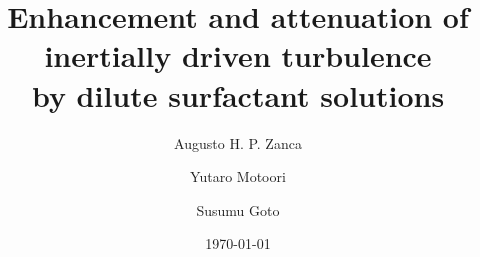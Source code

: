 \documentclass[aps,prfluids,groupedaddress,showkeys,11pt,tightenlines]{revtex4-2}
\begin{document}

\title{Enhancement and attenuation of inertially driven turbulence\\by dilute surfactant solutions}


\author{Augusto H. P. Zanca}
\author{Yutaro Motoori}
\author{Susumu Goto}


\date{\today}
\end{document}
